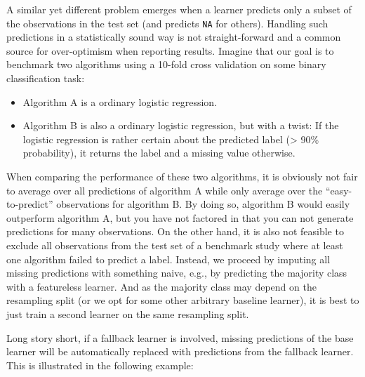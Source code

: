 \documentclass[
  11pt,
  parskip=half,
  DIV=calc,
  BCOR=10mm,
  x11names]{scrbook}
\providecommand{\tightlist}{%
  \setlength{\itemsep}{0pt}\setlength{\parskip}{0pt}}
\begin{document}
A similar yet different problem emerges when a learner predicts only a subset of the observations in the test set (and predicts \texttt{NA} for others).
Handling such predictions in a statistically sound way is not straight-forward and a common source for over-optimism when reporting results.
Imagine that our goal is to benchmark two algorithms using a 10-fold cross validation on some binary classification task:

\begin{itemize}
\tightlist
\item
  Algorithm A is a ordinary logistic regression.
\item
  Algorithm B is also a ordinary logistic regression, but with a twist:
  If the logistic regression is rather certain about the predicted label (\textgreater{} 90\% probability), it returns the label and a missing value otherwise.
\end{itemize}

When comparing the performance of these two algorithms, it is obviously not fair to average over all predictions of algorithm A while only average over the ``easy-to-predict'' observations for algorithm B.
By doing so, algorithm B would easily outperform algorithm A, but you have not factored in that you can not generate predictions for many observations.
On the other hand, it is also not feasible to exclude all observations from the test set of a benchmark study where at least one algorithm failed to predict a label.
Instead, we proceed by imputing all missing predictions with something naive, e.g., by predicting the majority class with a featureless learner.
And as the majority class may depend on the resampling split (or we opt for some other arbitrary baseline learner), it is best to just train a second learner on the same resampling split.

Long story short, if a fallback learner is involved, missing predictions of the base learner will be automatically replaced with predictions from the fallback learner.
This is illustrated in the following example:
\end{document}

